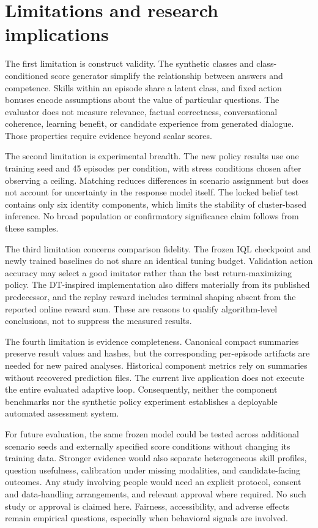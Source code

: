 \documentclass[10pt,a4paper]{article}
\begin{document}
\section{Limitations and research implications}
The first limitation is construct validity. The synthetic classes and class-conditioned score generator simplify the relationship between answers and competence. Skills within an episode share a latent class, and fixed action bonuses encode assumptions about the value of particular questions. The evaluator does not measure relevance, factual correctness, conversational coherence, learning benefit, or candidate experience from generated dialogue. Those properties require evidence beyond scalar scores.

The second limitation is experimental breadth. The new policy results use one training seed and 45 episodes per condition, with stress conditions chosen after observing a ceiling. Matching reduces differences in scenario assignment but does not account for uncertainty in the response model itself. The locked belief test contains only six identity components, which limits the stability of cluster-based inference. No broad population or confirmatory significance claim follows from these samples.

The third limitation concerns comparison fidelity. The frozen IQL checkpoint and newly trained baselines do not share an identical tuning budget. Validation action accuracy may select a good imitator rather than the best return-maximizing policy. The DT-inspired implementation also differs materially from its published predecessor, and the replay reward includes terminal shaping absent from the reported online reward sum. These are reasons to qualify algorithm-level conclusions, not to suppress the measured results.

The fourth limitation is evidence completeness. Canonical compact summaries preserve result values and hashes, but the corresponding per-episode artifacts are needed for new paired analyses. Historical component metrics rely on summaries without recovered prediction files. The current live application does not execute the entire evaluated adaptive loop. Consequently, neither the component benchmarks nor the synthetic policy experiment establishes a deployable automated assessment system.

For future evaluation, the same frozen model could be tested across additional scenario seeds and externally specified score conditions without changing its training data. Stronger evidence would also separate heterogeneous skill profiles, question usefulness, calibration under missing modalities, and candidate-facing outcomes. Any study involving people would need an explicit protocol, consent and data-handling arrangements, and relevant approval where required. No such study or approval is claimed here. Fairness, accessibility, and adverse effects remain empirical questions, especially when behavioral signals are involved.
\end{document}
